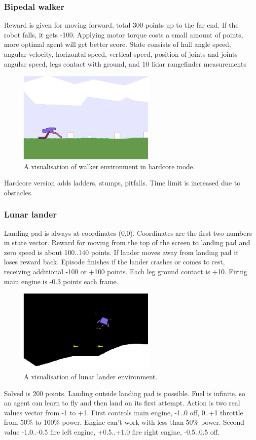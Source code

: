 \FloatBarrier
\subsubsection{Bipedal walker}
Reward is given for moving forward, total 300 points up to the far end. 
If the robot falls, it gets -100. Applying motor torque costs a small amount of points, 
more optimal agent will get better score.
State consists of hull angle speed, angular velocity, horizontal speed, vertical speed,
position of joints and joints angular speed, legs contact with ground, and 10 lidar 
rangefinder measurements
\begin{figure}[htb] 
	\centering
	\includegraphics[width=0.6\textwidth]{figures/walker}
	\caption{A visualisation of walker environment in hardcore mode.}
	\label{fig:walker}
\end{figure}
Hardcore version adds ladders, stumps, pitfalls. Time limit is increased due to obstacles. 

\FloatBarrier
\subsubsection{Lunar lander}
Landing pad is always at coordinates (0,0). Coordinates are the first two numbers in state vector.
Reward for moving from the top of the screen to landing pad and zero speed 
is about 100..140 points.
If lander moves away from landing pad it loses reward back. Episode finishes if the lander 
crashes or comes to rest, receiving additional -100 or +100 points.
Each leg ground contact is +10. Firing main engine is -0.3 points each frame.
\begin{figure}[htb] 
	\centering
	\includegraphics[width=0.6\textwidth]{figures/lunar}
	\caption{A visualisation of lunar lander environment.}
	\label{fig:lunar}
\end{figure}
Solved is 200 points. Landing outside landing pad is possible.
Fuel is infinite, so an agent can learn to fly and then land on its first attempt. 
Action is two real values vector from -1 to +1. First controls main engine, -1..0 off, 0..+1
throttle from 50\% to 100\% power. Engine can't work with less than 50\% power. 
Second value -1.0..-0.5 fire left engine, +0.5..+1.0 fire right engine, -0.5..0.5 off.

